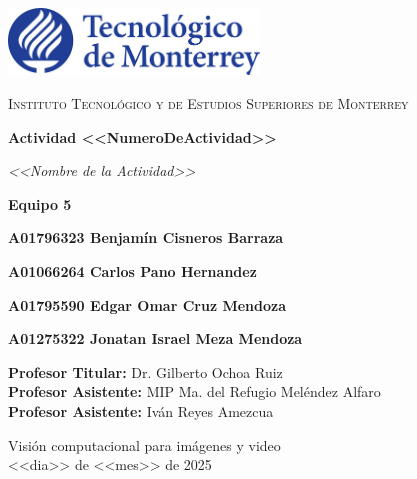 \documentclass[12pt,letterpaper]{article}
\begin{document}
\begin{titlepage}
  \centering
  \vspace*{0.5cm}
  \includegraphics[width=0.5\textwidth]{logo.jpg}\par
  \vspace{1.2cm}

  {\Large\scshape Instituto Tecnológico y de Estudios Superiores de Monterrey\par}
  \vspace{2.2cm}

  {\huge\bfseries Actividad <<NumeroDeActividad>>\par
   \vspace{0.2cm}
   \emph{<<Nombre de la Actividad>>}\par}
  \vspace{2.2cm}

  {\Large\bfseries Equipo 5\par}
  {\normalsize\bfseries A01796323 Benjamín Cisneros Barraza\par}
  {\normalsize\bfseries A01066264 Carlos Pano Hernandez\par}
  {\normalsize\bfseries A01795590 Edgar Omar Cruz Mendoza\par}
  {\normalsize\bfseries A01275322 Jonatan Israel Meza Mendoza\par}
  
  \vspace{1.2cm}

  \begin{flushleft}
    \normalsize \textbf{Profesor Titular:} Dr. Gilberto Ochoa Ruiz\\
    \normalsize \textbf{Profesor Asistente:} MIP Ma. del Refugio Meléndez Alfaro\\
    \normalsize \textbf{Profesor Asistente:} Iván Reyes Amezcua
  \end{flushleft}

  \vfill

  \begin{flushright}
    \normalsize Visión computacional para imágenes y video\\
    \normalsize <<dia>> de <<mes>> de 2025
  \end{flushright}
\end{titlepage}
\end{document}
